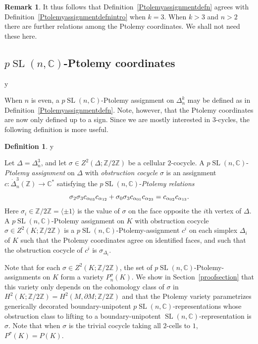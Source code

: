 \documentclass[11pt]{amsart}
\theoremstyle{definition}
\newtheorem{definition}[theorem]{Definition}
\newtheorem{remark}[theorem]{Remark}
\numberwithin{equation}{section}
\def\printname#1{
        \if\draft y
                \smash{\makebox[0pt]{\hspace{-0.5in}
                        \raisebox{8pt}{\tt\tiny #1}}}
        \fi
}
\def\lbl#1{\label{#1}\printname{#1}}
\DeclareMathOperator{\SL}{SL}
\newcommand{\C}{\mathbb C}
\newcommand{\Z}{\mathbb Z}
\begin{document}
\begin{remark} 
It thus follows that Definition~\ref{Ptolemyassignmentdefn} agrees with Definition~\ref{Ptolemyassignmentdefnintro} when $k=3$. When $k>3$ and $n>2$ there are further relations among the Ptolemy coordinates. We shall not need these here.
\end{remark}




\subsection{$p\SL(n,\C)$-Ptolemy coordinates}
\lbl{sub.pSL}

When $n$ is even, a $p\SL(n,\C)$-Ptolemy assignment on $\Delta^k_n$ may be defined as in Definition~\ref{Ptolemyassignmentdefn}. Note, however, that the Ptolemy coordinates are now only defined up to a sign. Since we are mostly interested in $3$-cycles, the following definition is more useful.

\begin{definition}
\lbl{pSLPtolemydefn}
Let $\Delta=\Delta^3_n$, and let $\sigma\in Z^2(\Delta;\Z/2\Z)$ be a cellular $2$-cocycle.
A $p\SL(n,\C)$-\emph{Ptolemy assignment} on $\Delta$ with \emph{obstruction cocycle} $\sigma$ is an assignment $c\colon\dot\Delta^3_n(\Z)\to\C^*$ satisfying the $p\SL(n,\C)$-\emph{Ptolemy relations}
\begin{equation}\lbl{pSLPtolemyrelation}
\sigma_2\sigma_3c_{\alpha_{03}}c_{\alpha_{12}}+\sigma_0\sigma_3c_{\alpha_{01}}c_{\alpha_{23}}=c_{\alpha_{02}}c_{\alpha_{13}}.
\end{equation}
Here $\sigma_{i}\in\Z/2\Z=\langle\pm 1\rangle$ is the value of $\sigma$ on the face opposite the $i$th vertex of $\Delta$. 
A $p\SL(n,\C)$-Ptolemy assignment on $K$ with obstruction cocycle $\sigma\in Z^2(K;\Z/2\Z)$ is a $p\SL(n,\C)$-Ptolemy-assignment $c^i$ on each simplex $\Delta_i$ of $K$ such that the Ptolemy coordinates agree on identified faces, and such that the obstruction cocycle of $c^i$ is $\sigma_{\Delta_i}$.  
\end{definition}

Note that for each $\sigma\in Z^2(K;\Z/2\Z)$, the set of $p\SL(n,\C)$-Ptolemy-assignments on $K$ form a variety $P_n^\sigma(K)$. We show in Section~\ref{proofsection} that this variety only depends on the cohomology class of $\sigma$ in $H^2(K;\Z/2\Z)=H^2(M,\partial M;\Z/2\Z)$ and that the Ptolemy variety parametrizes generically decorated boundary-unipotent $p\SL(n,\C)$-representations whose obstruction class to lifting to a boundary-unipotent $\SL(n,\C)$-representation is $\sigma$. Note that when $\sigma$ is the trivial cocycle taking all $2$-cells to $1$, $P^\sigma(K)=P(K)$. 
\end{document}
